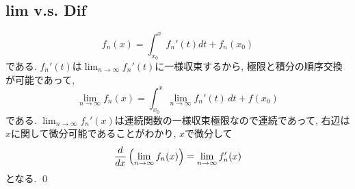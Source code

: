 \subsection{lim v.s. Dif}
\prf
\[f_n(x) = \int_{x_0}^{x} f_n'(t) dt + f_n(x_0)\]
である. $f_n'(t)$は$\lim_{n\to \infty} f_n'(t)$に一様収束するから, 極限と積分の順序交換が可能であって,
\[\lim_{n\to \infty}f_n(x) = \int_{x_0}^{x} \lim_{n\to \infty} f_n'(t)\, dt  + f(x_0)\]
である. $\lim_{n\to \infty} f_n'(x)$は連続関数の一様収束極限なので連続であって, 右辺は$x$に関して微分可能であることがわかり, $x$で微分して
\[\dfrac{d}{dx}\left( \lim_{n\to \infty} f_n(x) \right) = \lim_{n\to \infty} f_n'(x)\]
となる. \qed




